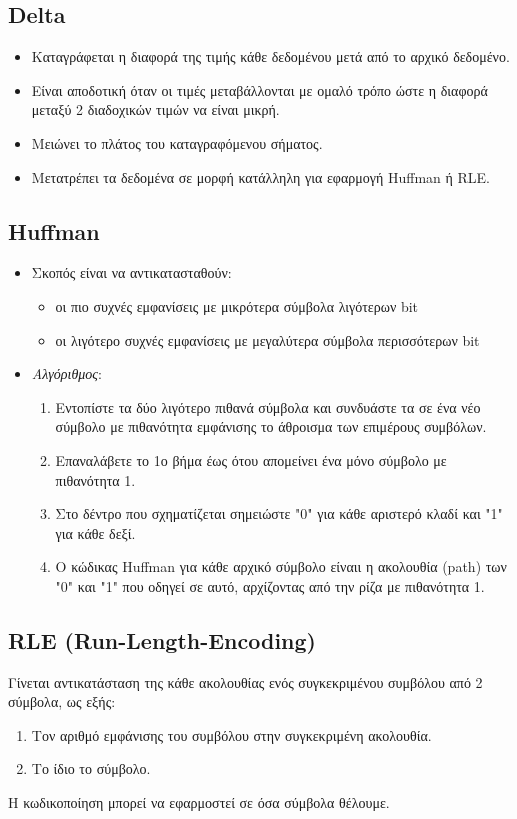 \documentclass[a4paper,12pt]{article}
\begin{document}
\subsection{Delta}
\begin{itemize}
    \item Καταγράφεται η διαφορά της τιμής κάθε δεδομένου μετά από το αρχικό δεδομένο.
    \item Είναι αποδοτική όταν οι τιμές μεταβάλλονται με ομαλό τρόπο ώστε η διαφορά μεταξύ
    2 διαδοχικών τιμών να είναι μικρή.
    \item Μειώνει το πλάτος του καταγραφόμενου σήματος.
    \item Μετατρέπει τα δεδομένα σε μορφή κατάλληλη για εφαρμογή Huffman ή RLE.
\end{itemize}
\subsection{Huffman}
\begin{itemize}
    \item Σκοπός είναι να αντικατασταθούν:
    \begin{itemize}
        \item οι πιο συχνές εμφανίσεις με μικρότερα σύμβολα λιγότερων bit
        \item οι λιγότερο συχνές εμφανίσεις με μεγαλύτερα σύμβολα περισσότερων bit
    \end{itemize}
    \item \textit{Αλγόριθμος}:
    \begin{enumerate}
        \item Εντοπίστε τα δύο λιγότερο πιθανά σύμβολα και συνδυάστε τα σε ένα νέο σύμβολο με 
        πιθανότητα εμφάνισης το άθροισμα των επιμέρους συμβόλων.
        \item Επαναλάβετε το 1ο βήμα έως ότου απομείνει ένα μόνο σύμβολο με πιθανότητα 1.
        \item Στο δέντρο που σχηματίζεται σημειώστε "0" για κάθε αριστερό κλαδί και "1" για κάθε
        δεξί.
        \item Ο κώδικας Huffman για κάθε αρχικό σύμβολο είναιι η ακολουθία (path) των "0" και "1"
        που οδηγεί σε αυτό, αρχίζοντας από την ρίζα με πιθανότητα 1.
    \end{enumerate}
\end{itemize}
\subsection{RLE (Run-Length-Encoding)}
Γίνεται αντικατάσταση της κάθε ακολουθίας ενός συγκεκριμένου
συμβόλου από 2 σύμβολα, ως εξής:
\begin{enumerate}
    \item Τον αριθμό εμφάνισης του συμβόλου στην συγκεκριμένη
          ακολουθία.
    \item Το ίδιο το σύμβολο.
\end{enumerate}
Η κωδικοποίηση μπορεί να εφαρμοστεί σε όσα σύμβολα θέλουμε.
\end{document}
